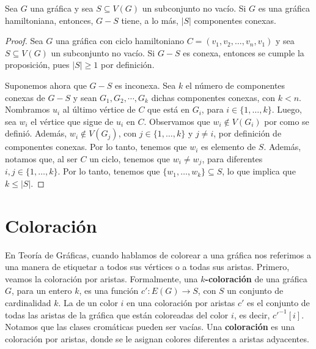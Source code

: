 \begin{proposicion}
\label{prop:hamilt}
   Sea $G$ una gr\'afica y sea $S \subseteq V(G)$ un subconjunto no vac\'io. Si
    $G$ es una gr\'afica hamiltoniana, entonces, $G-S$ tiene, a lo m\'as, $|S|$
    componentes conexas.
\end{proposicion}


\begin{proof}
    Sea $G$ una gr\'afica con ciclo hamiltoniano $C= (v_1, v_2, \dots, v_n,
    v_1)$ y sea $S \subseteq V(G)$ un subconjunto no vac\'io. Si $G-S$ es
    conexa, entonces se cumple la proposici\'on, pues $|S| \geq 1$ por
    definici\'on.
    
    Suponemos ahora que $G-S$ es inconexa. Sea $k$ el n\'umero de componentes
    conexas de $G-S$ y sean $G_1, G_2, \cdots, G_ k$ dichas componentes conexas,
    con $k < n$. Nombramos $u_i$ al \'ultimo v\'ertice de $C$ que est\'a en
    $G_i$, para $i \in \{1, \dots, k\}$. Luego, sea $w_i$ el v\'ertice que sigue
    de $u_i$ en $C$. Observamos que $w_i \notin V(G_i)$ por como se defini\'o.
    Adem\'as, $w_i \notin V(G_j)$, con $j \in \{1, \dots, k\}$ y $j \neq i$, por
    definici\'on de componentes conexas. Por lo tanto, tenemos que $w_i$ es
    elemento de $S$. Adem\'as, notamos que, al ser $C$ un ciclo, tenemos que
    $w_i \neq w_j$, para diferentes $i,j \in \{1, \dots, k\}$. Por lo tanto,
    tenemos que $\{w_1, \dots, w_k\} \subseteq S$, lo que implica que $k \leq
    |S|$. 
\end{proof} 

\section{Coloraci\'on}
\label{sec:coloracion}

En Teor\'ia de Gr\'aficas, cuando hablamos de colorear a una gr\'afica nos
referimos a una manera de etiquetar a todos sus v\'ertices o a todas sus
aristas. Primero, veamos la coloraci\'on por aristas. Formalmente, una
\textbf{$k$-coloraci\'on}  de una gr\'afica $G$, para un entero $k$,
es una funci\'on $c' \colon E(G)\to S$, con $S$ un conjunto de cardinalidad $k$.
La  de un color $i$ en una coloraci\'on por aristas
$c'$ es el conjunto de todas las aristas de la gr\'afica que est\'an coloreadas
del color $i$, es decir, $c'^{-1}[i]$. Notamos que las clases crom\'aticas
pueden ser vac\'ias. Una \textbf{coloraci\'on}
 es una coloraci\'on por aristas, donde se le asignan
colores diferentes a aristas adyacentes.

